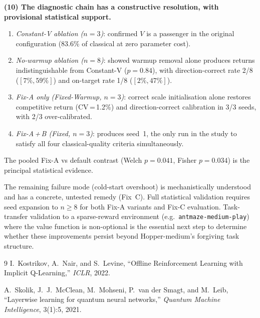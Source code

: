 \documentclass[10pt,a4paper]{article}
\begin{document}
\textbf{(10) The diagnostic chain has a constructive resolution, with
provisional statistical support.}
\begin{enumerate}
  \item \emph{Constant-V ablation ($n=3$)}: confirmed $V$ is a passenger in
        the original configuration (83.6\% of classical at zero parameter
        cost).
  \item \emph{No-warmup ablation ($n=8$)}: showed warmup removal alone
        produces returns indistinguishable from Constant-V ($p=0.84$),
        with direction-correct rate 2/8 ($[7\%,59\%]$) and on-target rate
        1/8 ($[2\%,47\%]$).
  \item \emph{Fix-A only (Fixed-Warmup, $n=3$)}: correct scale initialisation
        alone restores competitive return (CV\,=\,1.2\%) and direction-correct
        calibration in 3/3 seeds, with 2/3 over-calibrated.
  \item \emph{Fix-A\,+\,B (Fixed, $n=3$)}: produces seed~1, the only run
        in the study to satisfy all four classical-quality criteria
        simultaneously.
\end{enumerate}
The pooled Fix-A vs default contrast (Welch $p=0.041$, Fisher $p=0.034$) is
the principal statistical evidence.

The remaining failure mode (cold-start overshoot) is mechanistically
understood and has a concrete, untested remedy (Fix~C).
Full statistical validation requires seed expansion to $n\geq8$ for both
Fix-A variants and Fix-C evaluation.
Task-transfer validation to a sparse-reward environment (e.g.\
\texttt{antmaze-medium-play}) where the value function is non-optional
is the essential next step to determine whether these improvements persist
beyond Hopper-medium's forgiving task structure.

\begin{thebibliography}{9}
I.~Kostrikov, A.~Nair, and S.~Levine,
``Offline Reinforcement Learning with Implicit Q-Learning,''
\textit{ICLR}, 2022.

A.~Skolik, J.~J.~McClean, M.~Mohseni, P.~van der Smagt, and M.~Leib,
``Layerwise learning for quantum neural networks,''
\textit{Quantum Machine Intelligence}, 3(1):5, 2021.
\end{thebibliography}
\end{document}
